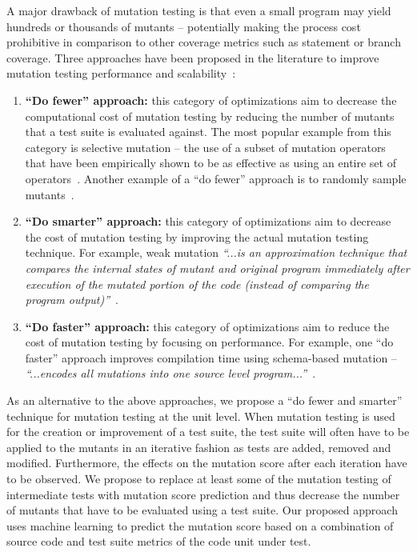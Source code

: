 \documentclass[conference]{IEEEtran}
\begin{document}
A major drawback of mutation testing is that even a small program may yield hundreds or thousands of mutants -- potentially making the process cost prohibitive in comparison to other coverage metrics such as statement or branch coverage. Three approaches have been proposed in the literature to improve mutation testing performance and scalability~\cite{OU00}:

\begin{enumerate}
  \item \textbf{``Do fewer'' approach:} this category of optimizations aim to decrease the computational cost of mutation testing by reducing the number of mutants that a test suite is evaluated against. The most popular example from this category is selective mutation -- the use of a subset of mutation operators that have been empirically shown to be as effective as using an entire set of operators~\cite{OLR+96}. Another example of a ``do fewer'' approach is to randomly sample mutants~\cite{Won93}.

  \item \textbf{``Do smarter'' approach:} this category of optimizations aim to decrease the cost of mutation testing by improving the actual mutation testing technique. For example, weak mutation \emph{``...is an approximation technique that compares the internal states of mutant and original program immediately after execution of the mutated portion of the code (instead of comparing the program output)''}~\cite{OU00}.

  \item \textbf{``Do faster'' approach:} this category of optimizations aim to reduce the cost of mutation testing by focusing on performance. For example, one ``do faster'' approach improves compilation time using schema-based mutation -- \emph{``...encodes all mutations into one source level program...''}~\cite{OU00}.
\end{enumerate}

As an alternative to the above approaches, we propose a ``do fewer and smarter'' technique for mutation testing at the unit level.  When mutation testing is used for the creation or improvement of a test suite,  the test suite will often have to be applied to the mutants in an iterative fashion as tests are added, removed and modified. Furthermore, the effects on the mutation score after each iteration have to be observed. We propose to replace at least some of the mutation testing of intermediate tests with mutation score prediction and thus decrease the number of mutants that have to be evaluated using a test suite. Our proposed approach uses machine learning to predict the mutation score based on a combination of source code and test suite metrics of the code unit under test.
\end{document}
